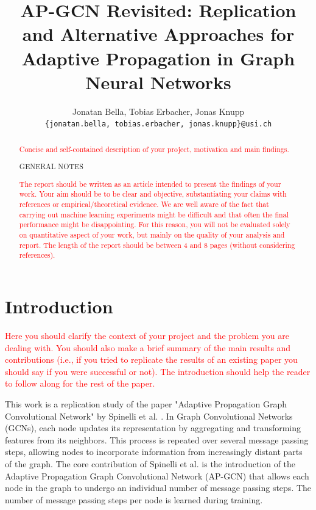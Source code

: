 \documentclass{gdl}
\begin{document}
\title{AP-GCN Revisited: Replication and Alternative Approaches for Adaptive Propagation in Graph Neural Networks}

\author{%
Jonatan Bella, Tobias Erbacher, Jonas Knupp\\
\texttt{\{jonatan.bella, tobias.erbacher, jonas.knupp\}@usi.ch}
}

\begin{abstract}
\textcolor{red}{Concise and self-contained description of your project, motivation and main findings.}

\begin{center}
    \sf\large\color{red} GENERAL NOTES
\end{center}

\textcolor{red}{The report should be written as an article intended to present the findings of your work. Your aim should be to be clear and objective, substantiating your claims with references or empirical/theoretical evidence.
We are well aware of the fact that carrying out machine learning experiments might be difficult and that often the final performance might be disappointing. For this reason, you will not be evaluated solely on quantitative aspect of your work, but mainly on the quality of your analysis and report.
The length of the report should be between 4 and 8 pages (without considering references).}

\end{abstract}

\maketitle

\section{Introduction}

\textcolor{red}{Here you should clarify the context of your project and the problem you are dealing with. You should also make a brief summary of the main results and contributions (i.e., if you tried to replicate the results of an existing paper you should say if you were successful or not). The introduction should help the reader to follow along for the rest of the paper.}

This work is a replication study of the paper "Adaptive Propagation Graph Convolutional Network" by Spinelli et al. \cite{spinelli2021}. In Graph Convolutional Networks (GCNs), each node updates its representation by aggregating and transforming features from its neighbors. This process is repeated over several message passing steps, allowing nodes to incorporate information from increasingly distant parts of the graph. The core contribution of Spinelli et al. is the introduction of the Adaptive Propagation Graph Convolutional Network (AP-GCN) that allows each node in the graph to undergo an individual number of message passing steps. The number of message passing steps per node is learned during training.
\end{document}

